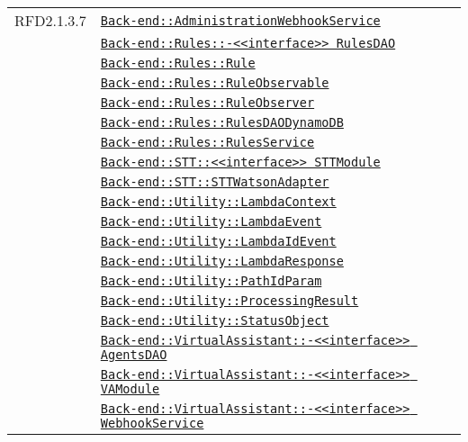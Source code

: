 \begin{longtable}{|>{\centering}m{3cm}|m{10cm}<{\centering}|}
RFD2.1.3.7 & \hyperref[Back-end::AdministrationWebhookService]{\texttt{Back-end::AdministrationWebhookService}}\\
& \hyperref[Back-end::Rules::<<interface>> RulesDAO]{\texttt{Back-end::Rules::-\linebreak <<interface>> RulesDAO}}\\
& \hyperref[Back-end::Rules::Rule]{\texttt{Back-end::Rules::Rule}}\\
& \hyperref[Back-end::Rules::RuleObservable]{\texttt{Back-end::Rules::RuleObservable}}\\
& \hyperref[Back-end::Rules::RuleObserver]{\texttt{Back-end::Rules::RuleObserver}}\\
& \hyperref[Back-end::Rules::RulesDAODynamoDB]{\texttt{Back-end::Rules::RulesDAODynamoDB}}\\
& \hyperref[Back-end::Rules::RulesService]{\texttt{Back-end::Rules::RulesService}}\\
& \hyperref[Back-end::STT::<<interface>> STTModule]{\texttt{Back-end::STT::<<interface>> STTModule}}\\
& \hyperref[Back-end::STT::STTWatsonAdapter]{\texttt{Back-end::STT::STTWatsonAdapter}}\\
& \hyperref[Back-end::Utility::LambdaContext]{\texttt{Back-end::Utility::LambdaContext}}\\
& \hyperref[Back-end::Utility::LambdaEvent]{\texttt{Back-end::Utility::LambdaEvent}}\\
& \hyperref[Back-end::Utility::LambdaIdEvent]{\texttt{Back-end::Utility::LambdaIdEvent}}\\
& \hyperref[Back-end::Utility::LambdaResponse]{\texttt{Back-end::Utility::LambdaResponse}}\\
& \hyperref[Back-end::Utility::PathIdParam]{\texttt{Back-end::Utility::PathIdParam}}\\
& \hyperref[Back-end::Utility::ProcessingResult]{\texttt{Back-end::Utility::ProcessingResult}}\\
& \hyperref[Back-end::Utility::StatusObject]{\texttt{Back-end::Utility::StatusObject}}\\
& \hyperref[Back-end::VirtualAssistant::<<interface>> AgentsDAO]{\texttt{Back-end::VirtualAssistant::-\linebreak <<interface>> AgentsDAO}}\\
& \hyperref[Back-end::VirtualAssistant::<<interface>> VAModule]{\texttt{Back-end::VirtualAssistant::-\linebreak <<interface>> VAModule}}\\
& \hyperref[Back-end::VirtualAssistant::<<interface>> WebhookService]{\texttt{Back-end::VirtualAssistant::-\linebreak <<interface>> WebhookService}}\\

\end{longtable}
